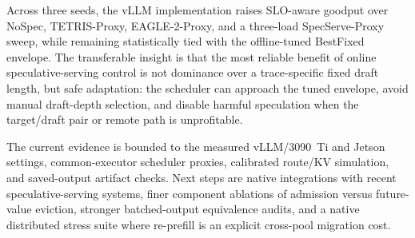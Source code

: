 \documentclass[journal]{IEEEtran}
\begin{document}
Across three seeds, the vLLM implementation raises SLO-aware goodput
over NoSpec, TETRIS-Proxy, EAGLE-2-Proxy, and a three-load
SpecServe-Proxy sweep, while remaining statistically tied with the
offline-tuned BestFixed envelope. The transferable insight is that the
most reliable benefit of online speculative-serving control is not
dominance over a trace-specific fixed draft length, but safe adaptation:
the scheduler can approach the tuned envelope, avoid manual draft-depth
selection, and disable harmful speculation when the target/draft pair or
remote path is unprofitable.

The current evidence is bounded to the measured vLLM/3090~Ti and
Jetson settings, common-executor scheduler proxies, calibrated
route/KV simulation, and saved-output artifact checks. Next steps are
native integrations with recent speculative-serving systems, finer
component ablations of admission versus future-value eviction, stronger
batched-output equivalence audits, and a native distributed stress suite
where re-prefill is an explicit cross-pool migration cost.



\end{document}

